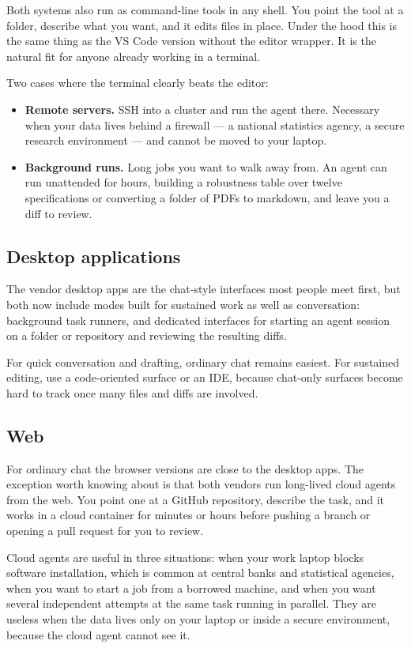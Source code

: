 \documentclass[11pt,a4paper]{article}
\begin{document}
Both systems also run as command-line tools in any shell. You point the tool at
a folder, describe what you want, and it edits files in place. Under the hood
this is the same thing as the VS Code version without the editor wrapper. It is
the natural fit for anyone already working in a terminal.

Two cases where the terminal clearly beats the editor:

\begin{itemize}
\item \textbf{Remote servers.} SSH into a cluster and run the agent there.
  Necessary when your data lives behind a firewall --- a national statistics
  agency, a secure research environment --- and cannot be moved to your laptop.
\item \textbf{Background runs.} Long jobs you want to walk away from. An agent
  can run unattended for hours, building a robustness table over twelve
  specifications or converting a folder of PDFs to markdown, and leave you a
  diff to review.
\end{itemize}

\subsection{Desktop applications}

The vendor desktop apps are the chat-style interfaces most people meet first,
but both now include modes built for sustained work as well as conversation:
background task runners, and dedicated interfaces for starting an agent session
on a folder or repository and reviewing the resulting diffs.

For quick conversation and drafting, ordinary chat remains easiest. For
sustained editing, use a code-oriented surface or an IDE, because chat-only
surfaces become hard to track once many files and diffs are involved.

\subsection{Web}

For ordinary chat the browser versions are close to the desktop apps. The
exception worth knowing about is that both vendors run long-lived cloud agents
from the web. You point one at a GitHub repository, describe the task, and it
works in a cloud container for minutes or hours before pushing a branch or
opening a pull request for you to review.

Cloud agents are useful in three situations: when your work laptop blocks
software installation, which is common at central banks and statistical
agencies, when you want to start a job from a borrowed machine, and when you
want several independent attempts at the same task running in parallel. They are
useless when the data lives only on your laptop or inside a secure environment,
because the cloud agent cannot see it.
\end{document}
